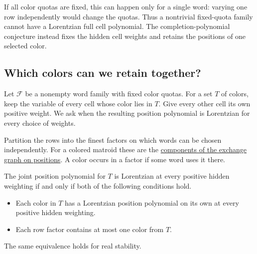 If all color quotas are fixed, this can happen only for a single word:
varying one row independently would change the quotas. Thus a nontrivial
fixed-quota family cannot have a Lorentzian full cell polynomial.
The completion-polynomial conjecture instead fixes the hidden cell
weights and retains the positions of one selected color.

\subsection[jointColorPositions]{Which colors can we retain together?}

Let $\mathcal F$ be a nonempty word family with fixed color quotas.
For a set $T$ of colors, keep the variable of every cell whose color lies
in $T$. Give every other cell its own positive weight. We ask when the
resulting position polynomial is Lorentzian for every choice of weights.

Partition the rows into the finest factors on which words can be chosen
independently. For a colored matroid these are the
\href{exchange-graphs.htm#components}{components of the exchange graph
on positions}. A color occurs in a factor if some word uses it there.

\begin{theorem}
The joint position polynomial for $T$ is Lorentzian at every positive
hidden weighting if and only if both of the following conditions hold.
\begin{itemize}
\item Each color in $T$ has a Lorentzian position polynomial on its own
at every positive hidden weighting.
\item Each row factor contains at most one color from $T$.
\end{itemize}
The same equivalence holds for real stability.
\end{theorem}

